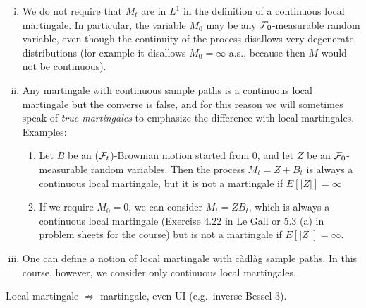 \begin{remark} \label{chap4.2:remark-remarks_on_definition_of_continuous_local_martingale}
\begin{enumerate}[(i)]
    \item We do not require that $M_t$ are in $L^1$ in the definition of a continuous local martingale. In particular, the variable $M_0$ may be any $\mathcal{F}_0$-measurable random variable, even though the continuity of the process disallows very degenerate distributions (for example it disallows $M_0=\infty$ a.s., because then $M$ would not be continuous).
    \item Any martingale with continuous sample paths is a continuous local martingale but the converse is false, and for this reason we will sometimes speak of \textit{true martingales} to emphasize the difference with local martingales. Examples:
    \begin{enumerate}[label=(Ex.\arabic*.)]
        \item Let $B$ be an ($\mathcal{F}_t$)-Brownian motion started from 0, and let $Z$ be an $\mathcal{F}_0$-measurable random variables. Then the process $M_t = Z + B_t$ is always a continuous local martingale, but it is not a martingale if $E[|Z|]=\infty$
        \item If we require $M_0=0$, we can consider $M_t=ZB_t$, which is always a continuous local martingale (Exercise 4.22 in Le Gall or 5.3 (a) in problem sheets for the course) but is not a martingale if $E[|Z|]=\infty$.
    \end{enumerate}
    \item One can define a notion of local martingale with càdlàg sample paths. In this course, however, we consider only continuous local martingales.
\end{enumerate}
\end{remark}
\begin{trap} Local martingale $\not\Rightarrow$ martingale, even UI (e.g.\ inverse Bessel-3). \end{trap}

